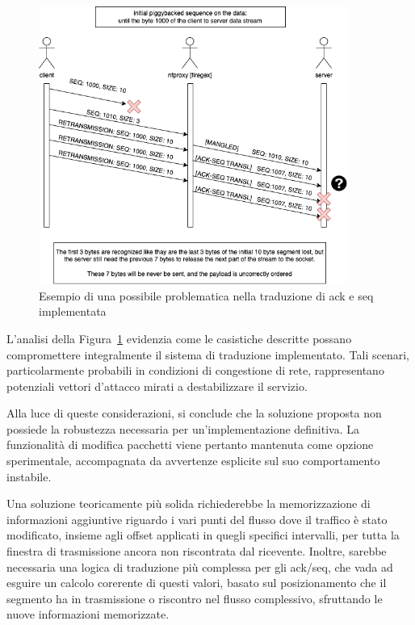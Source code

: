 \begin{figure}[H]
    \centering
    \includegraphics[width=0.90\textwidth]{images/chapter3/TCP_ack_seq_transl_failure.drawio.png}
    \caption{Esempio di una possibile problematica nella traduzione di \gls{ack} e \gls{seq} implementata}\label{fig:tcp_ack_seq_transl_failure}
\end{figure}
L'analisi della Figura~\ref{fig:tcp_ack_seq_transl_failure} evidenzia come le casistiche descritte possano compromettere integralmente il sistema di traduzione implementato. Tali scenari, particolarmente probabili in condizioni di congestione di rete, rappresentano potenziali vettori d'attacco mirati a destabilizzare il servizio.

Alla luce di queste considerazioni, si conclude che la soluzione proposta non possiede la robustezza necessaria per un'implementazione definitiva. La funzionalità di modifica pacchetti viene pertanto mantenuta come opzione sperimentale, accompagnata da avvertenze esplicite sul suo comportamento instabile.

Una soluzione teoricamente più solida richiederebbe la memorizzazione di informazioni aggiuntive riguardo i vari punti del flusso dove il traffico è stato modificato, insieme agli offset applicati in quegli specifici intervalli, per tutta la finestra di trasmissione ancora non riscontrata dal ricevente. Inoltre, sarebbe necessaria una logica di traduzione più complessa per gli \gls{ack}/\gls{seq}, che vada ad esguire un calcolo corerente di questi valori, basato sul posizionamento che il segmento ha in trasmissione o riscontro nel flusso complessivo, sfruttando le nuove informazioni memorizzate.

